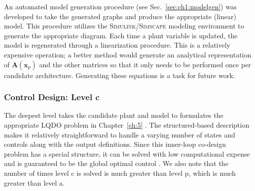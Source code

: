 An automated model generation procedure (see Sec.~\ref{sec:ch1:modelgen}) was developed to take the generated graphs and produce the appropriate (linear) model.
This procedure utilizes the \textsc{Simulink}/\textsc{Simscape} modeling environment to generate the appropriate diagram.
Each time a plant variable is updated, the model is regenerated through a linearization procedure.
This is a relatively expensive operation; a better method would generate an analytical representation of $\bm{A}(\bm{x}_p)$ and the other matrices so that it only needs to be performed once per candidate architecture.
Generating these equations is a task for future work.

\subsubsection{Control Design: Level c}

The deepest level takes the candidate plant and model to formulates the appropriate LQDO problem in Chapter~\ref{ch:5} \cite{manuscript-dt-qp}.
The structured-based description makes it relatively straightforward to handle a varying number of states and controls along with the output definitions.
Since this inner-loop co-design problem has a special structure, it can be solved with low computational expense and is guaranteed to be the global optimal control \cite{Herber2017b}.
We also note that the number of times level c is solved is much greater than level p, which is much greater than level a.